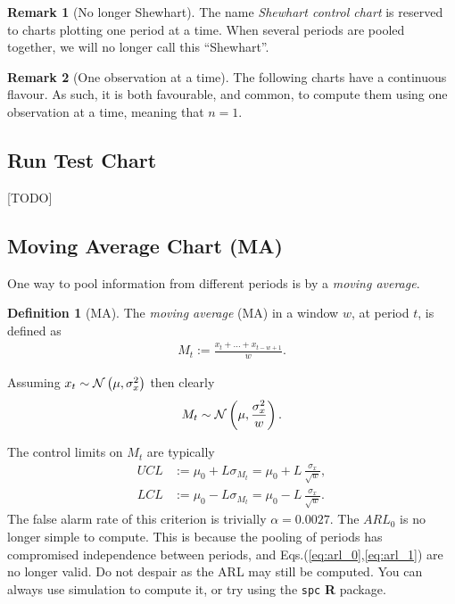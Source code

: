 \documentclass[12pt,a4paper]{report}
\theoremstyle{plain}
\theoremstyle{definition}
\newtheorem{definition}{Definition}
\newtheorem{remark}{Remark}
\newcommand{\R}{\textnormal{\sffamily\bfseries R }}
\newcommand{\rcode}[1]{\texttt{#1}}
\newcommand{\arm}{L}
\begin{document}
\begin{remark}[No longer Shewhart]
The name \emph{Shewhart control chart} is reserved to charts plotting one period at a time. 
When several periods are pooled together, we will no longer call this  ``Shewhart''.
\end{remark}

\begin{remark}[One observation at a time]
The following charts have a continuous flavour. As such, it is both favourable, and common, to compute them using one observation at a time, meaning that $n=1$. 
\end{remark}



\subsection{Run Test Chart}
[TODO]




\subsection{Moving Average Chart (MA)}

One way to pool information from different periods is by a \emph{moving average}.
\begin{definition}[MA]
The \emph{moving average} (MA) in a window $w$, at period $t$, is defined as
\begin{align}
	M_t:= \frac{x_t+\dots+x_{t-w+1}}{w}.
\end{align}
\end{definition}
Assuming $x_t \sim \mathcal{N}\left(\mu, \sigma_x^2\right)$ then clearly 
\begin{align}
	M_t \sim \mathcal{N}\left(\mu, \frac{\sigma_x^2}{w}\right).
\end{align}

The control limits on $M_t$ are typically
\begin{align}
	UCL &:= \mu_0 + \arm \sigma_{M_t}= \mu_0 + \arm \, \frac{\sigma_x}{\sqrt{w}}, \\
	LCL &:= \mu_0 - \arm \sigma_{M_t}= \mu_0 - \arm \, \frac{\sigma_x}{\sqrt{w}}.
\end{align}
The false alarm rate of this criterion is trivially $\alpha=0.0027$. 
The $ARL_0$ is no longer simple to compute. 
This is because the pooling of periods has compromised independence between periods, and Eqs.(\ref{eq:arl_0},\ref{eq:arl_1}) are no longer valid. 
Do not despair as the ARL may still be computed. 
You can always use simulation to compute it, or try using the \rcode{spc} \R package.
\end{document}
